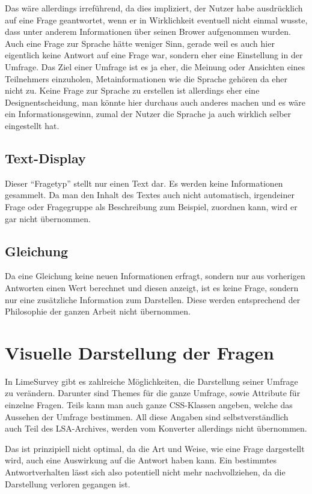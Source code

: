 Das wäre allerdings irreführend, da dies impliziert, der Nutzer habe ausdrücklich auf eine Frage geantwortet, wenn er in Wirklichkeit eventuell nicht einmal wusste, dass unter anderem Informationen über seinen Brower aufgenommen wurden.
Auch eine Frage zur Sprache hätte weniger Sinn, gerade weil es auch hier eigentlich keine Antwort auf eine Frage war, sondern eher eine Einstellung in der Umfrage.
Das Ziel einer Umfrage ist es ja eher, die Meinung oder Ansichten eines Teilnehmers einzuholen, Metainformationen wie die Sprache gehören da eher nicht zu.
Keine Frage zur Sprache zu erstellen ist allerdings eher eine Designentscheidung, man könnte hier durchaus auch anderes machen und es wäre ein Informationsgewinn, zumal der Nutzer die Sprache ja auch wirklich selber eingestellt hat.

\subsection{Text-Display}

Dieser \enquote{Fragetyp} stellt nur einen Text dar. Es werden keine Informationen gesammelt.
Da man den Inhalt des Textes auch nicht automatisch, irgendeiner Frage oder Fragegruppe als Beschreibung zum Beispiel, zuordnen kann, wird er gar nicht übernommen.

\subsection{Gleichung}

Da eine Gleichung keine neuen Informationen erfragt, sondern nur aus vorherigen Antworten einen Wert berechnet und diesen anzeigt, ist es keine Frage, sondern nur eine zusätzliche Information zum Darstellen.
Diese werden entsprechend der Philosophie der ganzen Arbeit nicht übernommen.


\section{Visuelle Darstellung der Fragen}
\label{d:themes}

In LimeSurvey gibt es zahlreiche Möglichkeiten, die Darstellung seiner Umfrage zu verändern.
Darunter sind Themes für die ganze Umfrage, sowie Attribute für einzelne Fragen.
Teils kann man auch ganze CSS-Klassen angeben, welche das Aussehen der Umfrage bestimmen.
All diese Angaben sind selbstverständlich auch Teil des LSA-Archives, werden vom Konverter allerdings nicht übernommen.

Das ist prinzipiell nicht optimal, da die Art und Weise, wie eine Frage dargestellt wird, auch eine Auswirkung auf die Antwort haben kann. %
Ein bestimmtes Antwortverhalten lässt sich also potentiell nicht mehr nachvollziehen, da die Darstellung verloren gegangen ist.

